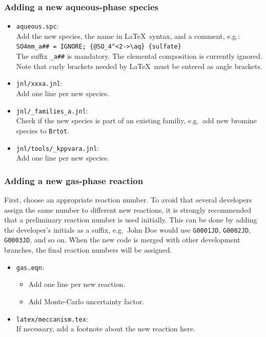 \documentclass[twoside]{article}
\def\nosep{\setlength\parsep{0mm}\setlength\topsep{0mm}\setlength\itemsep{0mm}}
\begin{document}
\subsubsection{Adding a new aqueous-phase species}

\begin{itemize}\nosep
\item \verb|aqueous.spc|:\\
  Add the new species, the name in La\TeX\ syntax, and a comment,
  e.g.:\\
  \verb|SO4mm_a## = IGNORE; {@SO_4^<2->\aq} {sulfate}|\\
  The suffix \verb|_a##| is mandatory. The elemental composition is
  currently ignored. Note that curly brackets needed by La\TeX\ must be
  entered as angle brackets.
\item \verb|jnl/xxxa.jnl|:\\
  Add one line per new species. 
\item \verb|jnl/_families_a.jnl|:\\
  Check if the new species is part of an existing familiy, e.g.\ add new
  bromine species to \verb|Brtot|.
\item \verb|jnl/tools/_kppvara.jnl|:\\
  Add one line per new species.
\end{itemize}

\subsubsection{Adding a new gas-phase reaction}
\label{sec:addgprxn}

First, choose an appropriate reaction number. To avoid that several
developers assign the same number to different new reactions, it is
strongly recommended that a preliminary reaction number is used
initially. This can be done by adding the developer's initials as a
suffix, e.g.\ John Doe would use \verb|G0001JD|, \verb|G0002JD|,
\verb|G0003JD|, and so on. When the new code is merged with other
development branches, the final reaction numbers will be assigned.

\begin{itemize}\nosep
\item \verb|gas.eqn|:
  \begin{itemize}
  \item Add one line per new reaction.
  \item Add Monte-Carlo uncertainty factor.
  \end{itemize}
\item \verb|latex/meccanism.tex|:\\
  If necessary, add a footnote about the new reaction here.
\end{itemize}
\end{document}
